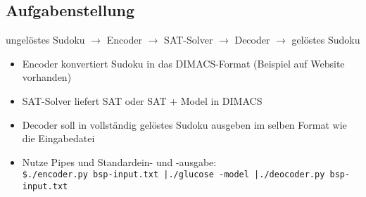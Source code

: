 \subsection{Aufgabenstellung}
ungelöstes Sudoku $\to$ Encoder $\to$ SAT-Solver $\to$ Decoder $\to$ gelöstes Sudoku
\begin{itemize}
	\item Encoder konvertiert Sudoku in das DIMACS-Format (Beispiel auf Website vorhanden)
	\item SAT-Solver liefert SAT oder SAT + Model in DIMACS
	\item Decoder soll in vollständig gelöstes Sudoku ausgeben im selben Format wie die Eingabedatei
	\item Nutze Pipes und Standardein- und -ausgabe:\\
		\texttt{\$./encoder.py bsp-input.txt |./glucose -model |./deocoder.py bsp-input.txt}
\end{itemize}
